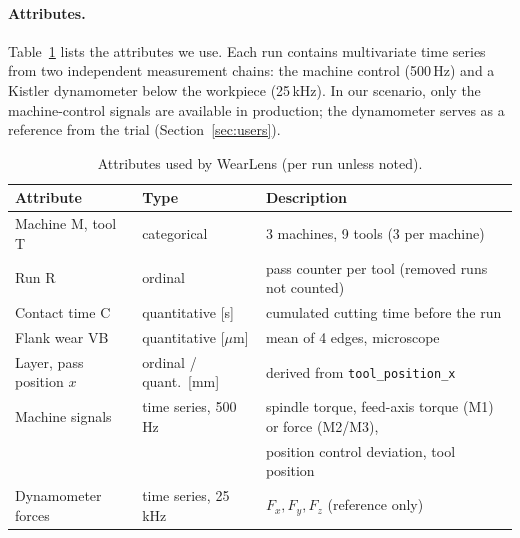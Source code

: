 \paragraph{Attributes.}
Table~\ref{tab:data} lists the attributes we use. Each run contains multivariate time series from two
independent measurement chains: the machine control (500\,Hz) and a Kistler dynamometer below the
workpiece (25\,kHz). In our scenario, only the machine-control signals are available in production;
the dynamometer serves as a reference from the trial (Section~\ref{sec:users}).

\begin{table}[t]
\centering\small
\caption{Attributes used by WearLens (per run unless noted).}
\label{tab:data}
\begin{tabular}{@{}lll@{}}
\toprule
Attribute & Type & Description \\
\midrule
Machine M, tool T & categorical & 3 machines, 9 tools (3 per machine) \\
Run R & ordinal & pass counter per tool (removed runs not counted) \\
Contact time C & quantitative [s] & cumulated cutting time before the run \\
Flank wear VB & quantitative [$\mu$m] & mean of 4 edges, microscope \\
Layer, pass position $x$ & ordinal / quant.\ [mm] & derived from \texttt{tool\_position\_x} \\
Machine signals & time series, 500\,Hz & spindle torque, feed-axis torque (M1) or force (M2/M3), \\
 & & position control deviation, tool position \\
Dynamometer forces & time series, 25\,kHz & $F_x, F_y, F_z$ (reference only) \\
\bottomrule
\end{tabular}
\end{table}

